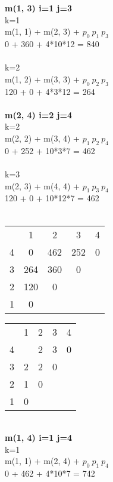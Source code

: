 \documentclass{article}
\begin{document}
    \textbf{m(1, 3) i=1 j=3} \\
    k=1 \\
    m(1, 1) + m(2, 3) + $ p_{0}\ p_{1}\  p_{3}$\\
    0 + 360 + 4*10*12 = 840 \\\\

    k=2 \\
    m(1, 2) + m(3, 3) + $ p_{0}\ p_{2}\  p_{3}$\\
    120 + 0 + 4*3*12 = 264\\\\

    \textbf{m(2, 4) i=2 j=4} \\
    k=2 \\
    m(2, 2) + m(3, 4) + $ p_{1}\ p_{2}\  p_{4}$\\
    0 + 252 + 10*3*7 = 462 \\\\

    k=3 \\
    m(2, 3) + m(4, 4) + $ p_{1}\ p_{3}\  p_{4}$\\
    120 + 0 + 10*12*7 = 462\\\\

    \begin{tabular}{ c | c | c | c | c }
            
        & 1 & 2 & 3 & 4 \\ 
    4 & 0 & 462 & 252 & 0 \\  
    3 & 264 & 360 & 0 \\
    2 & 120 & 0 \\
    1 & 0     
    \end{tabular}
    \begin{tabular}{ c | c | c | c | c }
            
        & 1 & 2 & 3 & 4 \\ 
      4 &   & 2 & 3 & 0 \\  
      3 & 2 & 2 & 0 \\
      2 & 1 & 0 \\
      1 & 0     
    \end{tabular}\\

    \textbf{m(1, 4) i=1 j=4} \\
    k=1 \\
    m(1, 1) + m(2, 4) + $ p_{0}\ p_{1}\  p_{4}$\\
    0 + 462 + 4*10*7 = 742 \\\\
\end{document}
